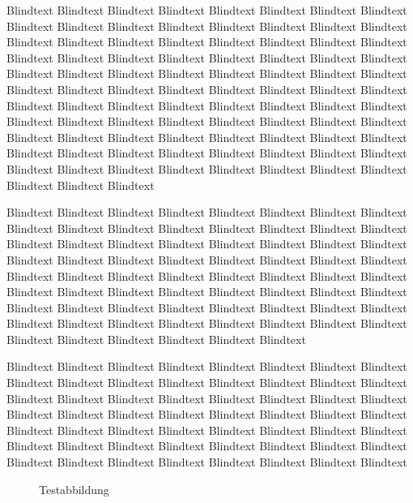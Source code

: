 Blindtext Blindtext Blindtext Blindtext Blindtext Blindtext Blindtext
Blindtext Blindtext Blindtext Blindtext Blindtext Blindtext Blindtext
Blindtext Blindtext Blindtext Blindtext Blindtext Blindtext Blindtext
Blindtext Blindtext Blindtext Blindtext Blindtext Blindtext Blindtext
Blindtext Blindtext Blindtext Blindtext Blindtext Blindtext Blindtext
Blindtext Blindtext Blindtext Blindtext Blindtext Blindtext Blindtext
Blindtext Blindtext Blindtext Blindtext Blindtext Blindtext Blindtext
Blindtext Blindtext Blindtext Blindtext Blindtext Blindtext Blindtext
Blindtext Blindtext Blindtext Blindtext Blindtext Blindtext Blindtext
Blindtext Blindtext Blindtext Blindtext Blindtext Blindtext Blindtext
Blindtext Blindtext Blindtext Blindtext Blindtext Blindtext Blindtext
Blindtext Blindtext Blindtext Blindtext Blindtext Blindtext Blindtext
Blindtext Blindtext Blindtext Blindtext Blindtext Blindtext Blindtext

Blindtext Blindtext Blindtext Blindtext Blindtext Blindtext Blindtext
Blindtext Blindtext Blindtext Blindtext Blindtext Blindtext Blindtext
Blindtext Blindtext Blindtext Blindtext Blindtext Blindtext Blindtext
Blindtext Blindtext Blindtext Blindtext Blindtext Blindtext Blindtext
Blindtext Blindtext Blindtext Blindtext Blindtext Blindtext Blindtext
Blindtext Blindtext Blindtext Blindtext Blindtext Blindtext Blindtext
Blindtext Blindtext Blindtext Blindtext Blindtext Blindtext Blindtext
Blindtext Blindtext Blindtext Blindtext Blindtext Blindtext Blindtext
Blindtext Blindtext Blindtext Blindtext Blindtext Blindtext Blindtext
Blindtext Blindtext Blindtext Blindtext Blindtext Blindtext Blindtext

Blindtext Blindtext Blindtext Blindtext Blindtext Blindtext Blindtext
Blindtext Blindtext Blindtext Blindtext Blindtext Blindtext Blindtext
Blindtext Blindtext Blindtext Blindtext Blindtext Blindtext Blindtext
Blindtext Blindtext Blindtext Blindtext Blindtext Blindtext Blindtext
Blindtext Blindtext Blindtext Blindtext Blindtext Blindtext Blindtext
Blindtext Blindtext Blindtext Blindtext Blindtext Blindtext Blindtext
Blindtext Blindtext Blindtext Blindtext Blindtext Blindtext Blindtext
Blindtext Blindtext Blindtext Blindtext Blindtext Blindtext Blindtext

\begin{figure}[!htbp]
  \centering
  \caption{Testabbildung}
  \label{fig:test}
\end{figure}

